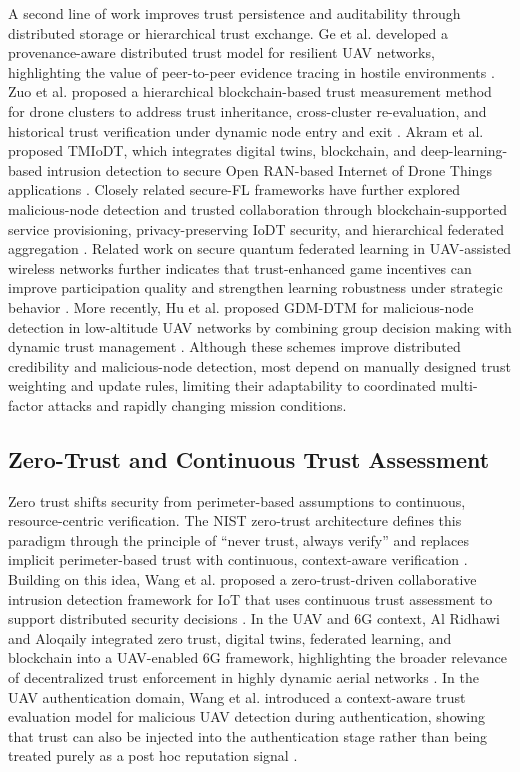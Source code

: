 \documentclass[notspecified,article,submit,moreauthors]{Definitions/mdpi}
\begin{document}
A second line of work improves trust persistence and auditability through distributed storage or hierarchical trust exchange. Ge et al. developed a provenance-aware distributed trust model for resilient UAV networks, highlighting the value of peer-to-peer evidence tracing in hostile environments \cite{ge2021uavpro}. Zuo et al. proposed a hierarchical blockchain-based trust measurement method for drone clusters to address trust inheritance, cross-cluster re-evaluation, and historical trust verification under dynamic node entry and exit \cite{zuo2023blockchain}. Akram et al. proposed TMIoDT, which integrates digital twins, blockchain, and deep-learning-based intrusion detection to secure Open RAN-based Internet of Drone Things applications \cite{akram2024tmiodt}. Closely related secure-FL frameworks have further explored malicious-node detection and trusted collaboration through blockchain-supported service provisioning, privacy-preserving IoDT security, and hierarchical federated aggregation \cite{abubaker2022blockchained,akram2023chained,zheng2024tinyfl,tong2024hierarchicalfl}. Related work on secure quantum federated learning in UAV-assisted wireless networks further indicates that trust-enhanced game incentives can improve participation quality and strengthen learning robustness under strategic behavior \cite{trustgame_qfl_uav}. More recently, Hu et al. proposed GDM-DTM for malicious-node detection in low-altitude UAV networks by combining group decision making with dynamic trust management \cite{hu2025gdm}. Although these schemes improve distributed credibility and malicious-node detection, most depend on manually designed trust weighting and update rules, limiting their adaptability to coordinated multi-factor attacks and rapidly changing mission conditions.

\subsection{Zero-Trust and Continuous Trust Assessment}
Zero trust shifts security from perimeter-based assumptions to continuous, resource-centric verification. The NIST zero-trust architecture defines this paradigm through the principle of ``never trust, always verify'' and replaces implicit perimeter-based trust with continuous, context-aware verification \cite{rose2020zero}. Building on this idea, Wang et al. proposed a zero-trust-driven collaborative intrusion detection framework for IoT that uses continuous trust assessment to support distributed security decisions \cite{wang2025continuous}. In the UAV and 6G context, Al Ridhawi and Aloqaily integrated zero trust, digital twins, federated learning, and blockchain into a UAV-enabled 6G framework, highlighting the broader relevance of decentralized trust enforcement in highly dynamic aerial networks \cite{ridhawi2023zerotrust6g}. In the UAV authentication domain, Wang et al. introduced a context-aware trust evaluation model for malicious UAV detection during authentication, showing that trust can also be injected into the authentication stage rather than being treated purely as a post hoc reputation signal \cite{wang2026wolf}.
\end{document}
